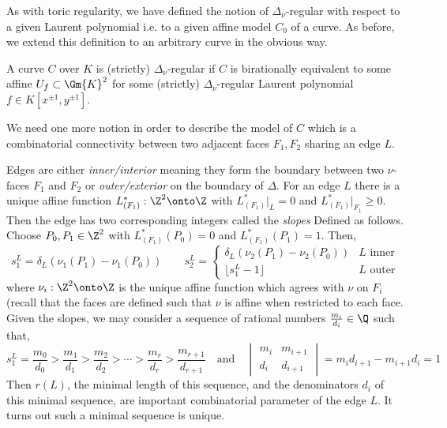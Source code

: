 \begin{rmk}
As with toric regularity, we have defined the notion of $\Delta_\nu$-regular with respect to a given Laurent polynomial i.e. to a given affine model $C_0$ of a curve. As before, we extend this definition to an arbitrary curve in the obvious way.
\end{rmk}

\begin{defn}
A curve $C$ over $K$ is (strictly) $\Delta_\nu$-regular if $C$ is birationally equivalent to some affine $U_f \subset \Gm{K}^2$ for some (strictly) $\Delta_\nu$-regular Laurent polynomial $f \in K[x^{\pm 1}, y^{\pm 1}]$. 
\end{defn}

\begin{rmk}
We need one more notion in order to describe the model of $C$ which is a combinatorial connectivity between two adjacent faces $F_1, F_2$ sharing an edge $L$. 
\end{rmk}

\begin{defn}[Slopes]
Edges are either \textit{inner/interior} meaning they form the boundary between two $\nu$-faces $F_1$ and $F_2$ or \textit{outer/exterior} on the boundary of $\Delta$. For an edge $L$ there is a unique affine function $L^*_{(F_1)} : \Z^2 \onto \Z$ with $L^*_{(F_1)} |_L = 0$ and $L^*_{(F_1)}|_{F_1} \ge 0$. Then the edge has two corresponding integers called the \textit{slopes} Defined as follows. Choose $P_0, P_1 \in \Z^2$ with $L^*_{(F_1)}(P_0) = 0$ and $L_{(F_1)}^*(P_1) =1$. Then,
\[ s_1^L = \delta_L (\nu_1(P_1) - \nu_1(P_0)) \quad \quad s_2^L = 
\begin{cases}
\delta_L (\nu_2(P_1) - \nu_2(P_0)) & L \text{ inner}
\\
\lfloor s_1^L - 1 \rfloor & L \text{ outer}
\end{cases} \]
where $\nu_i : \Z^2 \onto \Z$ is the unique affine function which agrees with $\nu$ on $F_i$ (recall that the faces are defined such that $\nu$ is affine when restricted to each face. Given the slopes, we may consider a sequence of rational numbers $\frac{m_i}{d_i} \in \Q$ such that,
\[ s_1^L = \frac{m_0}{d_0} > \frac{m_1}{d_1} > \frac{m_2}{d_2} > \cdots > \frac{m_r}{d_r} > \frac{m_{r+1}}{d_{r+1}} \quad \text{and} \quad 
\begin{vmatrix}
m_i & m_{i+1}
\\
d_i & d_{i+1}
\end{vmatrix} = m_i d_{i+1} - m_{i+1} d_i = 1 \]
Then $r(L)$, the minimal length of this sequence, and the denominators $d_i$ of this minimal sequence, are important combinatorial parameter of the edge $L$. It turns out such a minimal sequence is unique.
\end{defn}

